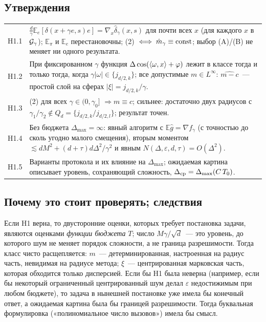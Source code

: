 \documentclass[11pt,a4paper]{article}
\numberwithin{equation}{section}
\theoremstyle{definition}
\theoremstyle{remark}
\newcommand{\E}{\mathbb E}\newcommand{\R}{\mathbb R}\newcommand{\N}{\mathbb N}\let\Prob\relax\newcommand{\Prob}{\mathbb P}
\newcommand{\Dmax}{\Delta_{\max}}\newcommand{\Dcp}{\Delta_{\rm cp}}
\begin{document}
\subsection{Утверждения}
\begin{center}\small
\begin{tabularx}{\textwidth}{@{}lX@{}}
\toprule
H1.1 & $\frac d\gamma\E_e[\delta(x+\gamma e,s)e]=\nabla_x\hat\delta_\gamma(x,s)$ для почти всех $x$ (для каждого $x$ в $\mathcal G_\gamma$); $\E_\pi$ и $\E_e$ перестановочны; (2) $\iff\hat m_\gamma\equiv{\rm const}$; выбор (A)/(B) не меняет ни одного результата. \\
H1.2 & При фиксированном $\gamma$ функция $\Delta\cos(\langle \omega,x\rangle+\varphi)$ лежит в классе тогда и только тогда, когда $\gamma|\omega|\in\{j_{d/2,k}\}$; все допустимые $m\in L^\infty$: $\widehat{m-c}$~--- простой слой на сферах $|\xi|=j_{d/2,k}/\gamma$. \\
H1.3 & (2) для всех $\gamma\in(0,\gamma_0]$ $\Rightarrow m\equiv c$; сильнее: достаточно двух радиусов с $\gamma_1/\gamma_2\notin Q_d=\{j_{d/2,k}/j_{d/2,l}\}$; результат точен. \\
H1.4 & Без бюджета $\Dmax=\infty$: явный алгоритм с $\E\hat g=\nabla f_\gamma$ (с точностью до сколь угодно малого смещения), вторым моментом $\lesssim dM^2+(d+\tau)d\Delta^2/\gamma^2$ и явным $N(\Delta,\varepsilon,d,\tau)=O(\Delta^2)$. \\
H1.5 & Варианты протокола и их влияние на $\Dmax$; ожидаемая картина описывает уровень, сохраняющий сложность, $\Dcp=\Dmax(C\,T_0)$. \\
\bottomrule
\end{tabularx}
\end{center}

\subsection{Почему это стоит проверять; следствия}
Если H1 верна, то двусторонние оценки, которых требует постановка задачи, являются оценками \emph{функции бюджета} $T$; число $M\gamma/\sqrt d$~--- это уровень, до которого шум не меняет порядок сложности, а не граница разрешимости.
Тогда класс чисто расщепляется: $m$~--- детерминированная, настроенная на радиус часть, невидимая на радиусе метода; $\xi$~--- центрированная марковская часть, которая обходится только дисперсией.
Если бы H1 была неверна (например, если бы некоторый ограниченный центрированный шум делал $\varepsilon$ недостижимым при любом бюджете), то задача в нынешней постановке уже имела бы конечный ответ, а ожидаемая картина была бы границей разрешимости. Тогда буквальная формулировка («полиномиальное число вызовов») имела бы смысл.
\end{document}
